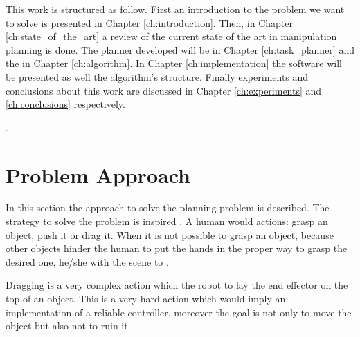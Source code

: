This work is structured as follow. First an introduction to the problem  we want to solve is presented in  Chapter \ref{ch:introduction}. Then, in Chapter \ref{ch:state_of_the_art} a review of the current state of the art in manipulation planning is done. The planner developed will be  in Chapter \ref{ch:task_planner}\DM{,} and the  in Chapter \ref{ch:algorithm}. In Chapter \ref{ch:implementation} the software  will be presented as well the algorithm's structure. Finally  experiments and conclusions about this work are discussed in Chapter \ref{ch:experiments} and \ref{ch:conclusions} respectively.

. 

\section{Problem Approach}
In this section the approach to solve the planning problem is described. The strategy to solve the problem is inspired . A human would   actions: grasp an object, push it or drag it. When it is not possible to grasp an object, because other objects hinder the human to put the hands in the proper way to grasp the desired one, he/she  with the scene  to .

Dragging is a very complex action which  the robot to lay the end effector on the top of an object. This is a very hard action which would imply an implementation of a reliable controller, moreover the goal is not only to move the object but also not to ruin it.


